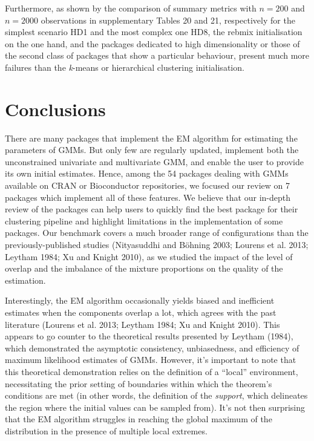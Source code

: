 Furthermore, as shown by the comparison of summary metrics with \(n=200\) and \(n=2000\) observations in supplementary Tables 20 and 21, respectively for the simplest scenario HD1 and the most complex one HD8, the rebmix initialisation on the one hand, and the packages dedicated to high dimensionality or those of the second class of packages that show a particular behaviour, present much more failures than the \emph{k}-means or hierarchical clustering initialisation.

\hypertarget{conclusions}{%
\section{Conclusions}\label{conclusions}}

There are many packages that implement the EM algorithm for estimating the parameters of GMMs. But only few are regularly updated,
implement both the unconstrained univariate and multivariate GMM, and enable the user to provide its own initial estimates. Hence, among the 54 packages dealing with GMMs available on CRAN or Bioconductor repositories, we focused our review on 7 packages which implement all of these features. We believe that our in-depth review of the packages can help users to quickly find the best package for their clustering
pipeline and highlight limitations in the implementation of some
packages. Our benchmark covers a much broader range of configurations
than the previously-published studies (Nityasuddhi and Böhning 2003; Lourens et al. 2013; Leytham 1984; Xu and Knight 2010), as we studied the impact of the level of overlap and the imbalance of the mixture proportions on the quality of the estimation.

Interestingly, the EM algorithm occasionally yields biased and inefficient estimates when the components overlap a lot, which agrees with the past literature (Lourens et al. 2013; Leytham 1984; Xu and Knight 2010). This appears to go counter to the theoretical results presented by Leytham (1984), which demonstrated the asymptotic consistency, unbiasedness, and efficiency of maximum likelihood estimates of GMMs. However, it's important to note that this theoretical demonstration relies on the definition of a ``local'' environment, necessitating the prior setting of boundaries within which the theorem's conditions are met (in other words, the definition of the \emph{support}, which delineates the region where the initial values can be sampled from). It's not then surprising that the EM algorithm struggles in reaching the global maximum of the distribution in the presence of multiple local extremes.

